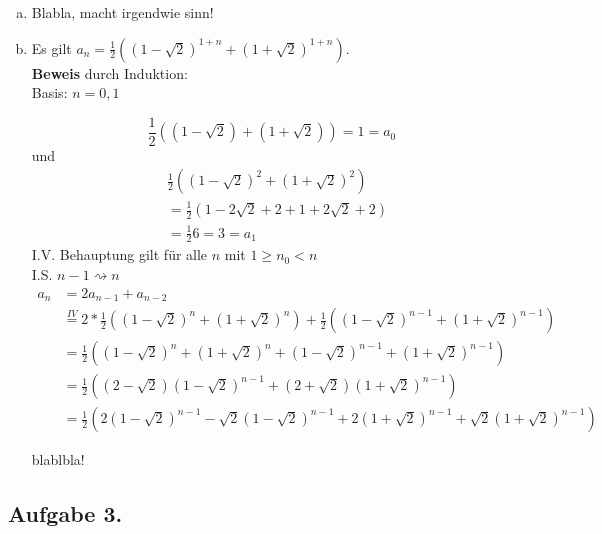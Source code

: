 \documentclass[11pt,a4paper,ngerman]{article}
\begin{document}
\begin{enumerate}[a)]
\item Blabla, macht irgendwie sinn!
\item Es gilt $a_n = \frac{1}{2} \left( \left(1-\sqrt{2} \right)^{1+n}+\left(1+\sqrt{2}\right)^{1+n} \right)$. \\
\textbf{Beweis} durch Induktion: \\
Basis: $n = 0,1$

\begin{equation*}
\frac{1}{2} \left((1-\sqrt{2})+(1+\sqrt{2}) \right) = 1 = a_0
\end{equation*}
und
\begin{equation*}\begin{split}
& \frac{1}{2} \left((1-\sqrt{2})^2+(1+\sqrt{2})^2 \right) \\
& = \frac{1}{2} \left(1-2\sqrt{2}+2+1+2\sqrt{2}+2 \right) \\
& = \frac{1}{2} 6 = 3 = a_1
\end{split}\end{equation*}
I.V. Behauptung gilt für alle $n$ mit $1 \geq n_0 < n$ \\
I.S. $n-1 \rightsquigarrow n$ \\
\begin{equation*}\begin{split}
a_{n} &= 2a_{n-1} + a_{n-2} \\
      &\stackrel{IV}{=} 2* \frac{1}{2} \left( \left(1-\sqrt{2} \right)^{n}+\left(1+\sqrt{2}\right)^{n} \right)
        +  \frac{1}{2} \left( \left(1-\sqrt{2} \right)^{n-1}+\left(1+\sqrt{2}\right)^{n-1} \right) \\
      &= \frac{1}{2} \left(\left(1-\sqrt{2} \right)^{n}+\left(1+\sqrt{2}\right)^{n} + \left(1-\sqrt{2} \right)^{n-1}+\left(1+\sqrt{2}\right)^{n-1} \right) \\
      &= \frac{1}{2} \left(\left(2-\sqrt{2} \right) \left(1-\sqrt{2} \right)^{n-1} + \left(2+\sqrt{2} \right) \left(1+\sqrt{2} \right)^{n-1} \right) \\
      &= \frac{1}{2} \left(2\left(1-\sqrt{2} \right)^{n-1}-\sqrt{2}\left(1-\sqrt{2} \right)^{n-1} + 2 \left(1+\sqrt{2} \right)^{n-1} + \sqrt{2}\left(1+\sqrt{2} \right)^{n-1} \right)
\end{split}\end{equation*}

blablbla!
\end{enumerate}

\subsection*{Aufgabe 3.}
\end{document}
